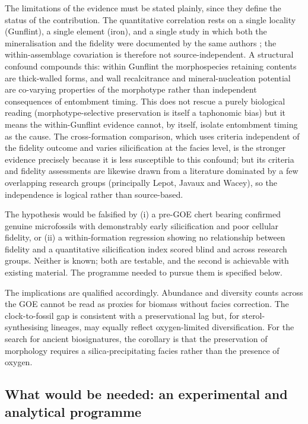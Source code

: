 \documentclass[11pt]{article}
\begin{document}
The limitations of the evidence must be stated plainly, since they define the status of the
contribution. The quantitative correlation rests on a single locality (Gunflint), a single element
(iron), and a single study in which both the mineralisation and the fidelity were documented by the
same authors \citep{Lepot2017a}; the within-assemblage covariation is therefore not
source-independent. A structural confound compounds this: within Gunflint the morphospecies retaining
contents are thick-walled forms, and wall recalcitrance and mineral-nucleation potential are
co-varying properties of the morphotype rather than independent consequences of entombment timing.
This does not rescue a purely biological reading (morphotype-selective preservation is itself a
taphonomic bias) but it means the within-Gunflint evidence cannot, by itself, isolate entombment
timing as the cause. The cross-formation comparison, which uses criteria independent of the fidelity
outcome and varies silicification at the facies level, is the stronger evidence precisely because it
is less susceptible to this confound; but its criteria and fidelity assessments are likewise drawn
from a literature dominated by a few overlapping research groups (principally Lepot, Javaux and
Wacey), so the independence is logical rather than source-based.

The hypothesis would be falsified by (i) a pre-GOE chert bearing confirmed genuine microfossils with
demonstrably early silicification and poor cellular fidelity, or (ii) a within-formation regression
showing no relationship between fidelity and a quantitative silicification index scored blind and
across research groups. Neither is known; both are testable, and the second is achievable with
existing material. The programme needed to pursue them is specified below.

The implications are qualified accordingly. Abundance and diversity counts across the GOE cannot be
read as proxies for biomass without facies correction. The clock-to-fossil gap is consistent with a
preservational lag but, for sterol-synthesising lineages, may equally reflect oxygen-limited
diversification. For the search for ancient biosignatures, the corollary is that the preservation of
morphology requires a silica-precipitating facies rather than the presence of oxygen.

\subsection{What would be needed: an experimental and analytical programme}
\end{document}
